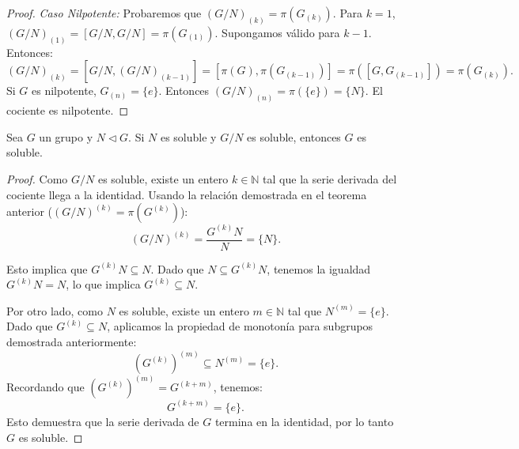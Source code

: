 \begin{proof}
    \textit{Caso Nilpotente:}
    Probaremos que $(G/N)_{(k)} = \pi(G_{(k)})$.
    Para $k=1$, $(G/N)_{(1)} = [G/N, G/N] = \pi(G_{(1)})$.
    Supongamos válido para $k-1$. Entonces:
    \begin{equation*}
        (G/N)_{(k)} = [G/N, (G/N)_{(k-1)}] = [\pi(G), \pi(G_{(k-1)})] = \pi([G, G_{(k-1)}]) = \pi(G_{(k)}).
    \end{equation*}
    Si $G$ es nilpotente, $G_{(n)} = \{e\}$. Entonces $(G/N)_{(n)} = \pi(\{e\}) = \{N\}$.
    El cociente es nilpotente.
\end{proof}

\begin{prop}
    Sea $G$ un grupo y $N \triangleleft G$.
    Si $N$ es soluble y $G/N$ es soluble, entonces $G$ es soluble.
\end{prop}

\begin{proof}
    Como $G/N$ es soluble, existe un entero $k \in \mathbb{N}$ tal que la serie derivada del cociente llega a la identidad. Usando la relación demostrada en el teorema anterior ($(G/N)^{(k)} = \pi(G^{(k)})$):
    \begin{equation*}
        (G/N)^{(k)} = \frac{G^{(k)}N}{N} = \{N\}.
    \end{equation*}

    Esto implica que $G^{(k)}N \subseteq N$. Dado que $N \subseteq G^{(k)}N$, tenemos la igualdad $G^{(k)}N = N$, lo que implica $G^{(k)} \subseteq N$.
    
    Por otro lado, como $N$ es soluble, existe un entero $m \in \mathbb{N}$ tal que $N^{(m)} = \{e\}$.
    Dado que $G^{(k)} \subseteq N$, aplicamos la propiedad de monotonía para subgrupos demostrada anteriormente:
    \begin{equation*}
        (G^{(k)})^{(m)} \subseteq N^{(m)} = \{e\}.
    \end{equation*}
    Recordando que $(G^{(k)})^{(m)} = G^{(k+m)}$, tenemos:
    \begin{equation*}
        G^{(k+m)} = \{e\}.
    \end{equation*}
    Esto demuestra que la serie derivada de $G$ termina en la identidad, por lo tanto $G$ es soluble.
\end{proof}


